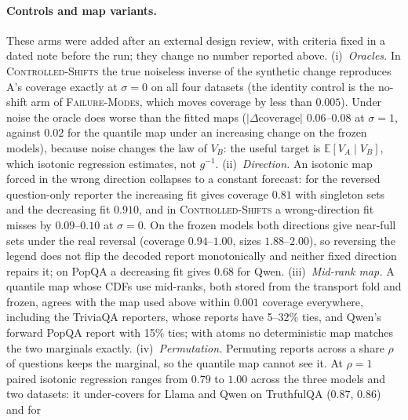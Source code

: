 \documentclass[11pt]{article}
\theoremstyle{definition}
\theoremstyle{remark}
\newcommand{\E}{\mathbb{E}}
\newcommand{\1}{\mathbf{1}}
\newcommand{\expname}[1]{\textsc{#1}}
\begin{document}
\paragraph{Controls and map variants.} These arms were added after an external design review, with
criteria fixed in a dated note before the run; they change no number reported above.
(i)~\emph{Oracles.} In \expname{Controlled-Shifts} the true noiseless inverse of the synthetic change reproduces
A's coverage exactly at $\sigma=0$ on all four datasets (the identity control is the no-shift arm of
\expname{Failure-Modes}, which moves coverage by less than $0.005$). Under noise the oracle does worse than the
fitted maps ($|\Delta\text{coverage}|$ $0.06$--$0.08$ at $\sigma=1$, against $0.02$ for the quantile map under
an increasing change on the frozen models), because noise changes the law of $V_B$: the useful target is
$\E[V_A\mid V_B]$, which isotonic regression estimates, not $g^{-1}$.
(ii)~\emph{Direction.} An isotonic map forced in the wrong direction collapses to a constant forecast:
for the reversed question-only reporter the increasing fit gives coverage $0.81$ with singleton sets
and the decreasing fit $0.910$, and in \expname{Controlled-Shifts} a wrong-direction fit misses by $0.09$--$0.10$ at
$\sigma=0$. On the frozen models both directions give near-full sets under the real reversal (coverage
$0.94$--$1.00$, sizes $1.88$--$2.00$), so reversing the legend does not flip the decoded report
monotonically and neither fixed direction repairs it; on PopQA a decreasing fit gives $0.68$ for Qwen.
(iii)~\emph{Mid-rank map.} A quantile map whose CDFs use mid-ranks, both stored from the transport fold
and frozen, agrees with the map used above within $0.001$ coverage everywhere, including the TriviaQA
reporters, whose reports have 5--32\% ties, and Qwen's forward PopQA report with 15\% ties; with atoms
no deterministic map matches the two marginals exactly.
(iv)~\emph{Permutation.} Permuting reports across a share $\rho$ of questions keeps the marginal, so the
quantile map cannot see it. At $\rho=1$ paired isotonic regression ranges from $0.79$ to $1.00$ across the
three models and two datasets: it under-covers for Llama and Qwen on TruthfulQA ($0.87$, $0.86$) and for
\end{document}
